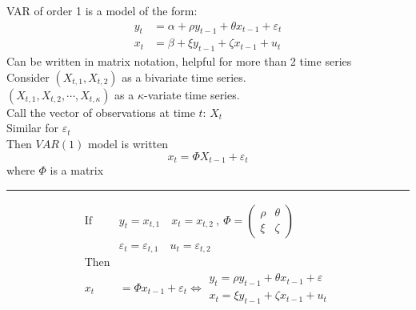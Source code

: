 VAR of order 1 is a model of the form: 
\begin{align*}
    y_t&= \alpha+\rho y_{t-1} + \theta x_{t-1} + \varepsilon_t\\
    x_t&= \beta + \xi y_{t-1} + \zeta x_{t-1} + u_t
\end{align*}
Can be written in matrix notation, helpful for more than 2 time series\\

\noindent
Consider $(X_{t,1}, X_{t,2})$ as a bivariate time series. \\
$(X_{t,1}, X_{t,2},\cdots,X_{t,\kappa})$ as a $\kappa$-variate time series. \\

\noindent
Call the vector of observations at time $t$: $X_t$ \\
Similar for $\varepsilon_t$ \\
Then $VAR(1)$ model is written \[
    x_t= \Phi X_{t-1} + \varepsilon_t
\] \quad where $\Phi$ is a matrix

\noindent
\rule{\linewidth}{0.4pt}
\begin{align*}
    \text{If } &y_t = x_{t,1}  \quad x_t = x_{t,2} \ ,\  \Phi = \begin{pmatrix}
\rho & \theta \\
\xi & \zeta 
\end{pmatrix} \\
&\varepsilon_t = \varepsilon_{t,1}  \quad u_t = \varepsilon_{t,2} \\
\text{Then} \\
x_t&= \Phi x_{t-1}+ \varepsilon_t \Leftrightarrow \begin{matrix}
    y_t=\rho y_{t-1} + \theta x_{t-1} + \varepsilon \\
    x_t = \xi y_{t-1} + \zeta x_{t-1} + u_t
\end{matrix}
\end{align*}

